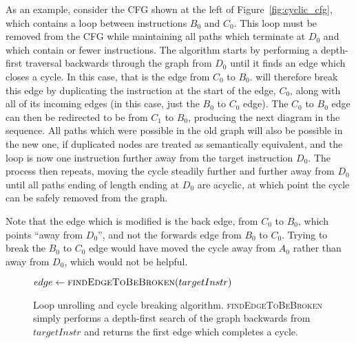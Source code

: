 As an example, consider the CFG shown at the left of
Figure~\ref{fig:cyclic_cfg}, which contains a loop between
instructions $B_0$ and $C_0$.  This loop must be removed from the CFG
while maintaining all paths which terminate at $D_0$ and which contain
\backref{$\alpha$} or fewer instructions.  The algorithm starts by
performing a depth-first traversal backwards through the graph from
$D_0$ until it finds an edge which closes a cycle.  In this case, that
is the edge from $C_0$ to $B_0$.  {\Technique} will therefore break
this edge by duplicating the instruction at the start of the edge,
$C_0$, along with all of its incoming edges (in this case, just the
$B_0$ to $C_0$ edge).  The $C_0$ to $B_0$ edge can then be redirected
to be from $C_1$ to $B_0$, producing the next diagram in the sequence.
All paths which were possible in the old graph will also be possible
in the new one, if duplicated nodes are treated as semantically
equivalent, and the loop is now one instruction further away from the
target instruction $D_0$.  The process then repeats, moving the cycle
steadily further and further away from $D_0$ until all paths ending of
length \backref{$\alpha$} ending at $D_0$ are acyclic, at which point
the cycle can be safely removed from the graph.

Note that the edge which is modified is the back edge, from $C_0$ to
$B_0$, which points ``away from $D_0$'', and not the forwards edge
from $B_0$ to $C_0$.  Trying to break the $B_0$ to $C_0$ edge would
have moved the cycle away from $A_0$ rather than away from $D_0$,
which would not be helpful.

\begin{figure}
\begin{algorithmic}[1]
     \State $edge \gets \textsc{findEdgeToBeBroken}(targetInstr)$
     \Else
        \EndFor
     \EndIf
  \EndWhile
\end{algorithmic}
\caption{Loop unrolling and cycle breaking algorithm.
  \textsc{findEdgeToBeBroken} simply performs a depth-first search of
  the graph backwards from $targetInstr$ and returns the first edge
  which completes a cycle.}
\label{fig:derive:read:unroll_cycle_break}
\end{figure}

